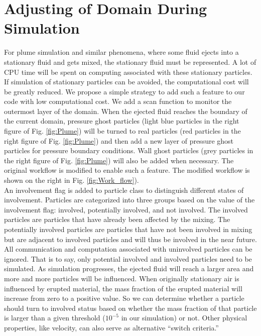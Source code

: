 \documentclass[procedia]{easychair}
\begin{document}
\section{Adjusting of Domain During Simulation} 
For plume simulation and similar phenomena, where some fluid ejects into a stationary fluid and gets mixed, the stationary fluid must be represented.
A lot of CPU time will be spent on computing associated with these stationary particles. If simulation of stationary particles can be avoided, the computational cost will be greatly reduced.
We propose a simple strategy to add such a feature to our code with low computational cost. We add a scan function to monitor the outermost layer of the domain. When the ejected fluid reaches the boundary of the current domain, pressure ghost particles (light blue particles in the right figure of Fig. \ref{fig:Plume}) will be turned to real particles (red particles in the right figure of Fig. \ref{fig:Plume}) and then add a new layer of pressure ghost particles for pressure boundary conditions. Wall ghost particles (grey particles in the right figure of Fig. \ref{fig:Plume}) will also be added when necessary. The original workflow is modified to enable such a feature. The modified workflow is shown on the right in Fig. \ref{fig:Work_flow}).\\
An involvement flag is added to particle class to distinguish different states of involvement. Particles are categorized into three groups based on the value of the involvement flag: involved, potentially involved, and not involved. The involved particles are particles that have already been affected by the mixing. The potentially involved particles are particles that have not been involved in mixing but are adjacent to involved particles and will thus be involved in the near future. 
All communication and computation associated with uninvolved particles can be ignored. That is to say, only potential involved and involved particles need to be simulated.
As simulation progresses, the ejected fluid will reach a larger area and more and more particles will be influenced. When originally stationary air is influenced by erupted material, the mass fraction of the erupted material will increase from zero to a positive value. So we can determine whether a particle should turn to involved status based on whether the mass fraction of that particle is larger than a given threshold ($10^{-5} $ in our simulation) or not. Other physical properties, like velocity, can also serve as alternative ``switch criteria.''\\
\end{document}
